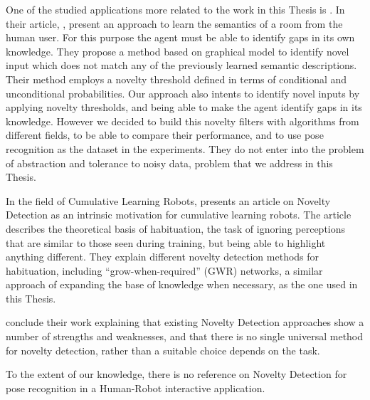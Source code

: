 One of the studied applications more related to the work in this Thesis is \cite{semantic}. In their article, \citeauthor{semantic}, present an approach to learn the semantics of a room from the human user. For this purpose the agent must be able to identify gaps in its own knowledge. They propose a method based on graphical model to identify novel input which does not match any of the previously learned semantic descriptions. Their method employs a novelty threshold defined in terms of conditional and unconditional probabilities. Our approach also intents to identify novel inputs by applying novelty thresholds, and being able to make the agent identify gaps in its knowledge. However we decided to build this novelty filters with algorithms from different fields, to be able to compare their performance, and to use pose recognition as the dataset in the experiments.  They do not enter into the problem of abstraction and tolerance to noisy data, problem that we address in this Thesis.

In the field of Cumulative Learning Robots, \citet{Nehmzow2013} presents an article on Novelty Detection as an intrinsic motivation for cumulative learning robots. The article describes the theoretical basis of habituation, the task of ignoring perceptions that are similar to those seen during training, but being able to highlight anything different. They explain different novelty detection methods for habituation, including “grow-when-required” (GWR) networks, a similar approach of expanding the base of knowledge when necessary, as the one used in this Thesis.

\citeauthor{Nehmzow2013} conclude their work  explaining that existing Novelty Detection approaches show a number of strengths and weaknesses, and that there is no single universal method for novelty detection, rather than a suitable choice depends on the task.

To the extent of our knowledge, there is no reference on Novelty Detection for pose recognition in a Human-Robot interactive application.

\begin{flushright}

\end{flushright}
